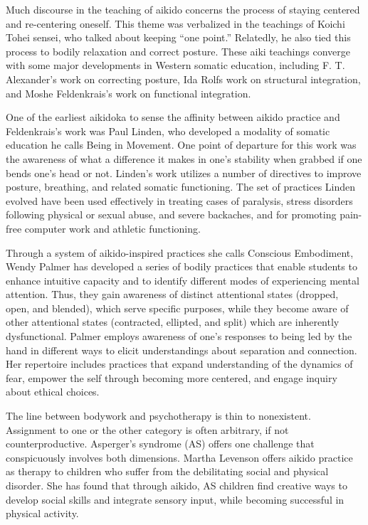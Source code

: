 Much discourse in the teaching of aikido concerns the process of staying centered and re-centering oneself. This theme was verbalized in the teachings of Koichi Tohei sensei, who talked about keeping ``one point.'' Relatedly, he also tied this process to bodily relaxation and correct posture. These aiki teachings converge with some major developments in Western somatic education, including F. T. Alexander's work on correcting posture, Ida Rolfs work on structural integration, and Moshe Feldenkrais's work on functional integration.

One of the earliest aikidoka to sense the affinity between aikido practice and Feldenkrais's work was Paul Linden, who developed a modality of somatic education he calls Being in Movement\textregistered. One point of departure for this work was the awareness of what a difference it makes in one's stability when grabbed if one bends one's head or not. Linden's work utilizes a number of directives to improve posture, breathing, and related somatic functioning. The set of practices Linden evolved have been used effectively in treating cases of paralysis, stress disorders following physical or sexual abuse, and severe backaches, and for promoting pain-free computer work and athletic functioning. 

Through a system of aikido-inspired practices she calls Conscious Embodiment, Wendy Palmer has developed a series of bodily practices that enable students to enhance intuitive capacity and to identify different modes of experiencing mental attention. Thus, they gain awareness of distinct attentional states (dropped, open, and blended), which serve specific purposes, while they become aware of other attentional states (contracted, ellipted, and split) which are inherently dysfunctional. Palmer employs awareness of one's responses to being led by the hand in different ways to elicit understandings about separation and connection. Her repertoire includes practices that expand understanding of the dynamics of fear, empower the self through becoming more centered, and engage inquiry about ethical choices. 

The line between bodywork and psychotherapy is thin to nonexistent. Assignment to one or the other category is often arbitrary, if not counterproductive. Asperger's syndrome (AS) offers one challenge that conspicuously involves both dimensions. Martha Levenson offers aikido practice as therapy to children who suffer from the debilitating social and physical disorder. She has found that through aikido, AS children find creative ways to develop social skills and integrate sensory input, while becoming successful in physical activity. 

